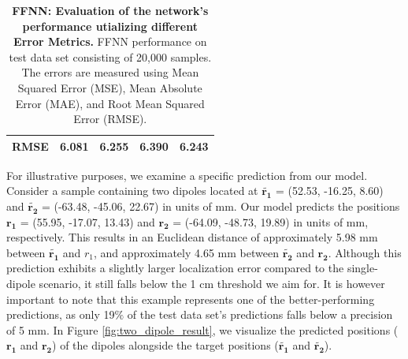 \documentclass[a4paper, UKenglish, 11pt]{uiomaster}
\begin{document}
\begin{table}[!htb]
\begin{tabular}{l|cccc|}
\multicolumn{1}{|l|}{\cellcolor[HTML]{EFEFEF}RMSE} & \multicolumn{1}{c|}{6.081}                                                                                  & \multicolumn{1}{c|}{6.255}                                                                                   & \multicolumn{1}{c|}{6.390}                                                                                   & 6.243                                                                                                              \\ \hline
\end{tabular}
\caption{\textbf{FFNN: Evaluation of the network's performance utializing different Error Metrics.} \newline
FFNN performance on test data set consisting of 20,000 samples. The errors are measured using Mean Squared Error (MSE), Mean Absolute Error (MAE), and Root Mean Squared Error (RMSE).}
\label{table:error_multiple_dipoles}
\end{table}

For illustrative purposes, we examine a specific prediction from our model. Consider a sample containing two dipoles located at $\tilde{\mathbf{r_1}}$ = (52.53, -16.25, 8.60) and $\tilde{\mathbf{r_2}}$ = (-63.48, -45.06, 22.67) in units of mm. Our model predicts the positions $\mathbf{r_1}$ = (55.95, -17.07, 13.43) and $\mathbf{r_2}$ = (-64.09, -48.73, 19.89) in units of mm, respectively. This results in an Euclidean distance of approximately 5.98 mm between $\tilde{\mathbf{r_1}}$ and $r_1$, and approximately 4.65 mm between $\tilde{\mathbf{r_2}}$ and $\mathbf{r_2}$. Although this prediction exhibits a slightly larger localization error compared to the single-dipole scenario, it still falls below the 1 cm threshold we aim for.
It is however important to note that this example represents one of the better-performing predictions, as only 19$\%$ of the test data set's predictions falls below a precision of 5 mm. In Figure \ref{fig:two_dipole_result}, we visualize the predicted positions ($\mathbf{r_1}$ and $\mathbf{r_2}$) of the dipoles alongside the target positions ($\mathbf{\tilde{r_1}}$ and $\mathbf{\tilde{r_2}}$).
\end{document}
